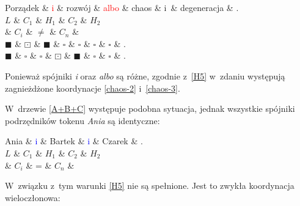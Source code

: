 \begin{exe}
\ex \label{H5-przykład}
\begin{dependency}[baseline=5.6ex]
\begin{deptext}[column sep=1em, row sep=.3ex]
Porządek \& \textcolor{red}{i} \& rozwój \& \textcolor{red}{albo} \& chaos \& i~\& degeneracja \& .  \\ 
$L$ \& $C_{1}$ \& $H_{1}$ \& $C_{2}$ \& $H_{2}$ \\
 \& $C_{i}$ \& $\neq$ \& $C_{n}$ \& \\
$\blacksquare$ \& $\boxdot$ \& $\blacksquare$ \& $\square$ \& $\square$ \& $\square$ \& $\square$ \& . \\
$\blacksquare$ \& $\square$ \& $\square$ \& $\boxdot$ \& $\blacksquare$ \& $\square$ \& $\square$ \& . \\
\end{deptext}
\end{dependency}
\end{exe}

Ponieważ spójniki \emph{i} oraz \emph{albo} są różne, zgodnie z~\eqref{H5} w~zdaniu występują zagnieżdżone koordynacje \eqref{chaos-2} i~\eqref{chaos-3}.

W~drzewie \eqref{A+B+C} występuje podobna sytuacja, jednak wszystkie spójniki podrzędników tokenu \emph{Ania} są identyczne:

\begin{exe}
\ex \label{A+B+C}
\begin{dependency}[baseline=2.9ex]
\begin{deptext}[column sep=1em, row sep=.3ex]
Ania \& \textcolor{blue}{i} \& Bartek \& \textcolor{blue}{i} \& Czarek \& .  \\ 
$L$ \& $C_{1}$ \& $H_{1}$ \& $C_{2}$ \& $H_{2}$ \\
 \& $C_{i}$ \& = \& $C_{n}$ \& \\
\end{deptext}
\end{dependency}
\end{exe}

W~związku z~tym warunki \eqref{H5} nie są spełnione. Jest to zwykła koordynacja wieloczłonowa:

